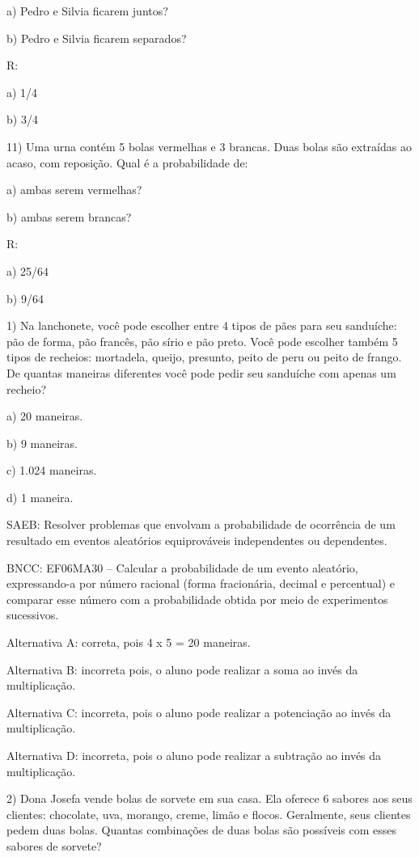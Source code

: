 a) Pedro e Silvia ficarem juntos?

b) Pedro e Silvia ficarem separados?

R:

a) 1/4

b) 3/4

11) Uma urna contém 5 bolas vermelhas e 3 brancas. Duas bolas são
extraídas ao acaso, com reposição. Qual é a probabilidade de:

a) ambas serem vermelhas?

b) ambas serem brancas?

R:

a) 25/64

b) 9/64


1) Na lanchonete, você pode escolher entre 4 tipos de pães para seu
sanduíche: pão de forma, pão francês, pão sírio e pão preto. Você pode
escolher também 5 tipos de recheios: mortadela, queijo, presunto, peito
de peru ou peito de frango. De quantas maneiras diferentes você pode
pedir seu sanduíche com apenas um recheio?

a) 20 maneiras.

b) 9 maneiras.

c) 1.024 maneiras.

d) 1 maneira.

SAEB: Resolver problemas que envolvam a probabilidade de ocorrência de
um resultado em eventos aleatórios equiprováveis independentes ou
dependentes.

BNCC: EF06MA30 -- Calcular a probabilidade de um evento aleatório,
expressando-a por número racional (forma fracionária, decimal e
percentual) e comparar esse número com a probabilidade obtida por meio
de experimentos sucessivos.

Alternativa A: correta, pois 4 x 5 = 20 maneiras.

Alternativa B: incorreta pois, o aluno pode realizar a soma ao invés da
multiplicação.

Alternativa C: incorreta, pois o aluno pode realizar a potenciação ao
invés da multiplicação.

Alternativa D: incorreta, pois o aluno pode realizar a subtração ao
invés da multiplicação.

2) Dona Josefa vende bolas de sorvete em sua casa. Ela oferece 6 sabores
aos seus clientes: chocolate, uva, morango, creme, limão e flocos.
Geralmente, seus clientes pedem duas bolas. Quantas combinações de duas
bolas são possíveis com esses sabores de sorvete?

